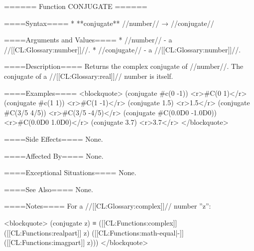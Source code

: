 ====== Function CONJUGATE ======

====Syntax====
  * **conjugate** //number// → //conjugate//

====Arguments and Values====
  * //number// - a //[[CL:Glossary:number]]//.
  * //conjugate// - a //[[CL:Glossary:number]]//.

====Description====
Returns the complex conjugate of //number//. The conjugate of a //[[CL:Glossary:real]]// number is itself.

====Examples====
<blockquote>
(conjugate #c(0 -1)) <r>#C(0 1)</r>
(conjugate #c(1 1)) <r>#C(1 -1)</r>
(conjugate 1.5) <r>1.5</r>
(conjugate #C(3/5 4/5)) <r>#C(3/5 -4/5)</r>
(conjugate #C(0.0D0 -1.0D0)) <r>#C(0.0D0 1.0D0)</r>
(conjugate 3.7) <r>3.7</r>
</blockquote>

====Side Effects====
None.

====Affected By====
None.

====Exceptional Situations====
None.

====See Also====
None.

====Notes====
For a //[[CL:Glossary:complex]]// number ''z'':

<blockquote> (conjugate z) ≡ ([[CL:Functions:complex]] ([[CL:Functions:realpart]] z) ([[CL:Functions:math-equal|-]] ([[CL:Functions:imagpart]] z))) </blockquote>

